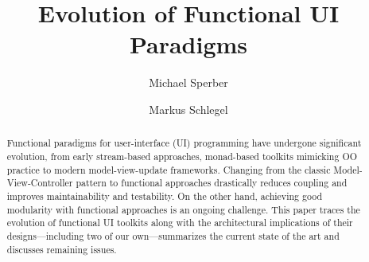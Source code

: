 \documentclass[sigplan,review,screen]{acmart}
\begin{document}
\title{Evolution of Functional UI Paradigms}

\author{Michael Sperber}

\author{Markus Schlegel}

\begin{abstract}
  Functional paradigms for user-interface (UI) programming have
  undergone significant evolution, from early
  stream-based approaches, monad-based toolkits mimicking OO practice
  to modern model-view-update frameworks.  Changing from the
  classic Model-View-Controller pattern to
  functional approaches 
  drastically reduces coupling and improves maintainability and
  testability.  On the other hand, achieving good modularity with
  functional approaches is an ongoing challenge.  This paper traces
  the evolution of functional UI toolkits along with the architectural
  implications of their designs---including two of our own---summarizes
  the current state of the art and discusses remaining issues.
\end{abstract}
\end{document}
